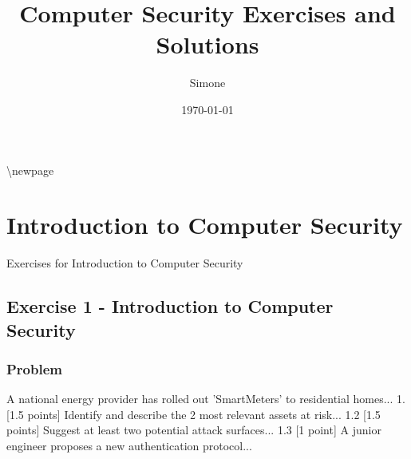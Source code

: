 \documentclass{article}
\title{Computer Security Exercises and Solutions}
\author{Simone}
\date{\today}
\begin{document}
\maketitle
\tableofcontents

\textbackslash{}newpage
\section{Introduction to Computer Security}
Exercises for Introduction to Computer Security

\subsection{Exercise 1 - Introduction to Computer Security}
\subsubsection*{Problem}
A national energy provider has rolled out 'SmartMeters' to residential homes... 1. [1.5 points] Identify and describe the 2 most relevant assets at risk... 1.2 [1.5 points] Suggest at least two potential attack surfaces... 1.3 [1 point] A junior engineer proposes a new authentication protocol...
\end{document}
